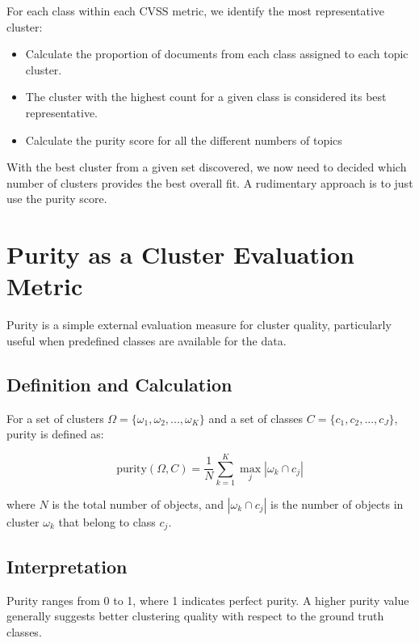 \documentclass[12pt]{article}
\begin{document}
For each class within each CVSS metric, we identify the most representative cluster:

\begin{itemize}

	\item Calculate the proportion of documents from each class assigned to each topic cluster.

	\item The cluster with the highest count for a given class is considered its best representative.

	\item Calculate the purity score for all the different numbers of topics

\end{itemize}

With the best cluster from a given set discovered, we now need to decided which number of clusters
provides the best overall fit. A rudimentary approach is to just use the purity score.

\section{Purity as a Cluster Evaluation Metric}

Purity is a simple external evaluation measure for cluster quality, particularly useful when
predefined classes are available for the data.

\subsection{Definition and Calculation}

For a set of clusters $\Omega = \{\omega_1, \omega_2, ..., \omega_K\}$ and a set of classes $C =
	\{c_1, c_2, ..., c_J\}$, purity is defined as:

\begin{equation}
	\text{purity}(\Omega, C) = \frac{1}{N} \sum_{k=1}^K \max_j |\omega_k \cap c_j|
\end{equation}

where $N$ is the total number of objects, and $|\omega_k \cap c_j|$ is the number of objects in
cluster $\omega_k$ that belong to class $c_j$.

\subsection{Interpretation}

Purity ranges from 0 to 1, where 1 indicates perfect purity. A higher purity value generally
suggests better clustering quality with respect to the ground truth classes\cite{purity_info_ret}.
\end{document}
